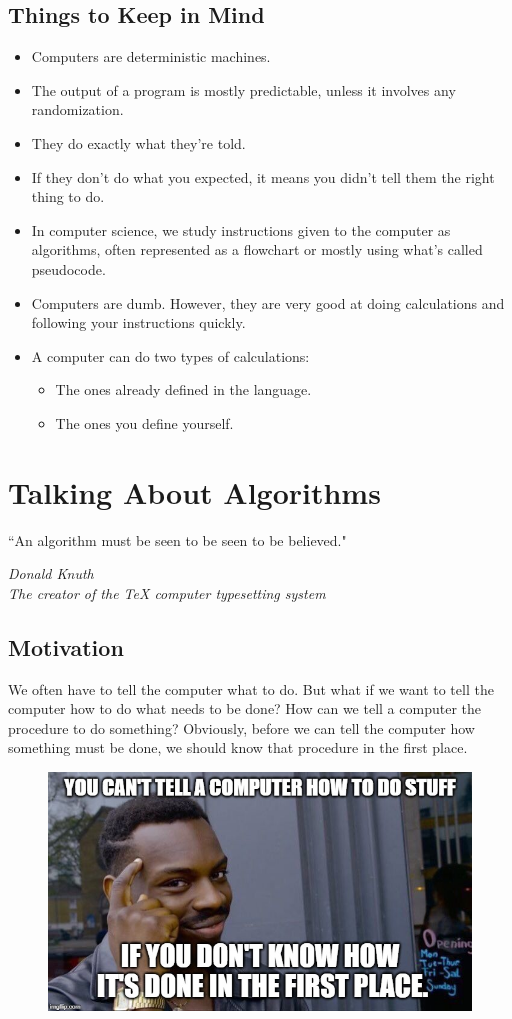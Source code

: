 \documentclass[letterpaper, 12pt]{book}
\begin{document}
\section{Things to Keep in Mind}
\begin{itemize}
	\item Computers are deterministic machines.
	\item The output of a program is mostly predictable, unless it involves any randomization.
	\item They do exactly what they're told.
	\item If they don't do what you expected, it means you didn't tell them the right thing to do.
	\item In computer science, we study instructions given to the computer as algorithms, often represented as a flowchart or mostly using what's called pseudocode.
	\item Computers are dumb. However, they are very good at doing calculations and following your instructions quickly.
	\item A computer can do two types of calculations:
	\begin{itemize}
		\item The ones already defined in the language.
		\item The ones you define yourself.
	\end{itemize}
\end{itemize}
\chapter{Talking About Algorithms}
\epigraph{\centering ``An algorithm must be seen to be seen to be believed."}{\textit{Donald Knuth \\ The creator of the TeX computer typesetting system}}
\section{Motivation}
We often have to tell the computer what to do. But what if we want to tell the computer how to do what needs to be done? How can we tell a computer the procedure to do something? Obviously, before we can tell the computer how something must be done, we should know that procedure in the first place.\\
\begin{figure}[h]
\centering
\includegraphics[scale=0.3]{img/algo_intro_meme}
\end{figure}
\end{document}

